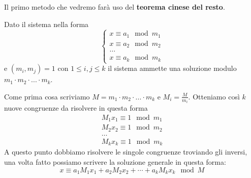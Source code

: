 Il primo metodo che vedremo far\`a uso del \textbf{teorema cinese del resto}.
\begin{theorem}
	Dato il sistema nella forma
	\begin{equation*}
		\begin{cases}
			x \equiv a_1 \mod{m_1} \\
			x \equiv a_2 \mod{m_2} \\
			\dots                  \\
			x \equiv a_k \mod{m_k}
		\end{cases}
	\end{equation*}
	e $(m_i, m_j) = 1$ con $1 \leq i, j \leq k$ il sistema ammette una soluzione modulo
	$m_1 \cdot m_2 \cdot ... \cdot m_k$.

	Come prima cosa scriviamo $M = m_1 \cdot m_2 \cdot ... \cdot m_k$ e $M_i = \frac{M}{m_i}$.
	Otteniamo cos\`i $k$ nuove congruenze da risolvere in questa forma
	\begin{equation*}
		\begin{array}{l}
			M_1 x_1 \equiv 1 \mod{m_1} \\
			M_2 x_2 \equiv 1 \mod{m_2} \\
			\dots                      \\
			M_k x_k \equiv 1 \mod{m_k}
		\end{array}
	\end{equation*}
	A questo punto dobbiamo risolvere le singole congruenze troviando gli inversi, una volta
	fatto possiamo scrivere la soluzione generale in questa forma:
	\begin{equation*}
		x \equiv a_1 M_1 x_1 + a_2 M_2 x_2 + \cdots + a_k M_k x_k \mod{M}
	\end{equation*}
\end{theorem}

